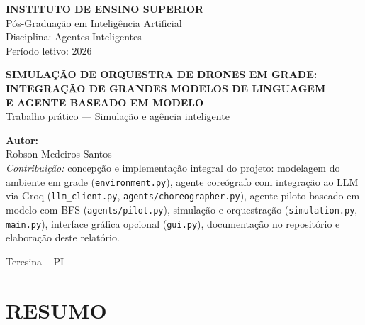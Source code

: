 \documentclass[12pt,a4paper,oneside]{article}
\begin{document}
\begin{titlepage}
\centering
\onehalfspacing
\vspace*{1.5cm}

{\fontsize{14}{16}\selectfont\textbf{INSTITUTO DE ENSINO SUPERIOR}}\\[0.3cm]
{\fontsize{12}{14}\selectfont Pós-Graduação em Inteligência Artificial}\\[0.5cm]
{\fontsize{12}{14}\selectfont Disciplina: Agentes Inteligentes}\\[0.5cm]
{\fontsize{12}{14}\selectfont Período letivo: 2026}

\vfill

{\fontsize{14}{18}\selectfont\textbf{SIMULAÇÃO DE ORQUESTRA DE DRONES EM GRADE:\\INTEGRAÇÃO DE GRANDES MODELOS DE LINGUAGEM\\E AGENTE BASEADO EM MODELO}}\\[0.8cm]
{\fontsize{12}{14}\selectfont Trabalho prático --- Simulação e agência inteligente}

\vfill

\begin{flushleft}
\fontsize{12}{14}\selectfont
\textbf{Autor:}\\[0.4cm]
Robson Medeiros Santos\\
\textit{Contribuição:} concepção e implementação integral do projeto: modelagem do ambiente em grade (\texttt{environment.py}), agente coreógrafo com integração ao LLM via Groq (\texttt{llm\_client.py}, \texttt{agents/choreographer.py}), agente piloto baseado em modelo com BFS (\texttt{agents/pilot.py}), simulação e orquestração (\texttt{simulation.py}, \texttt{main.py}), interface gráfica opcional (\texttt{gui.py}), documentação no repositório e elaboração deste relatório.
\end{flushleft}

\vfill

{\fontsize{12}{14}\selectfont Teresina -- PI}\\
{\fontsize{12}{14}}

\end{titlepage}
\hypersetup{pageanchor=true}

\newpage
\setcounter{page}{1}

\section*{RESUMO}
\end{document}
